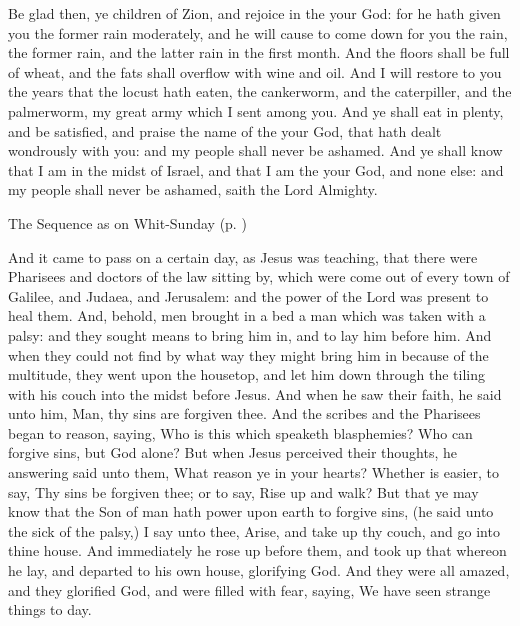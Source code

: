 \vspace{-0.25\baselineskip}

 Be glad then, ye children of Zion, and rejoice in the  your God: for he hath given you the former rain moderately, and he will cause to come down for you the rain, the former rain, and the latter rain in the first month. And the floors shall be full of wheat, and the fats shall overflow with wine and oil. And I will restore to you the years that the locust hath eaten, the cankerworm, and the caterpiller, and the palmerworm, my great army which I sent among you. And ye shall eat in plenty, and be satisfied, and praise the name of the  your God, that hath dealt wondrously with you: and my people shall never be ashamed. And ye shall know that I am in the midst of Israel, and that I am the  your God, and none else: and my people shall never be ashamed, saith the Lord Almighty.

\begin{rubric}
{The Sequence as on Whit-Sunday (p. \pageref{WhitSeq})}
\end{rubric}

\vspace{-0.25\baselineskip}

 And it came to pass on a certain day, as Jesus was teaching, that there were Pharisees and doctors of the law sitting by, which were come out of every town of Galilee, and Judaea, and Jerusalem: and the power of the Lord was present to heal them. And, behold, men brought in a bed a man which was taken with a palsy: and they sought means to bring him in, and to lay him before him. And when they could not find by what way they might bring him in because of the multitude, they went upon the housetop, and let him down through the tiling with his couch into the midst before Jesus. And when he saw their faith, he said unto him, Man, thy sins are forgiven thee. And the scribes and the Pharisees began to reason, saying, Who is this which speaketh blasphemies? Who can forgive sins, but God alone? But when Jesus perceived their thoughts, he answering said unto them, What reason ye in your hearts? Whether is easier, to say, Thy sins be forgiven thee; or to say, Rise up and walk? But that ye may know that the Son of man hath power upon earth to forgive sins, (he said unto the sick of the palsy,) I say unto thee, Arise, and take up thy couch, and go into thine house. And immediately he rose up before them, and took up that whereon he lay, and departed to his own house, glorifying God. And they were all amazed, and they glorified God, and were filled with fear, saying, We have seen strange things to day.

